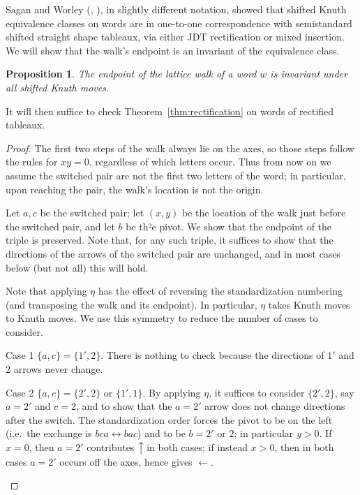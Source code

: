 \documentclass[10pt]{amsart}
\newtheorem{prop}[theorem]{Proposition}
\theoremstyle{definition}
\providecommand{\ie}{i.e.\ }
\newcommand{\west}[1]{\ensuremath{\xleftarrow{\ #1\ }}}
\newcommand{\north}[1]{\ensuremath{\big \uparrow \!\text{\raisebox{.1ex}{\scriptsize $#1$}}}}
\begin{document}
Sagan and Worley (\cite{Sagan}, \cite{Worley}), in slightly different notation, showed that shifted Knuth equivalence classes on words are in one-to-one correspondence with semistandard shifted straight shape tableaux, via either JDT rectification or mixed insertion. We will show that the walk's endpoint is an invariant of the equivalence class.

\begin{prop}\label{prop:walks}
The endpoint of the lattice walk of a word $w$ is invariant under all shifted Knuth moves.
\end{prop}
It will then suffice to check Theorem~\ref{thm:rectification} on words of rectified tableaux. 

\begin{proof}
The first two steps of the walk always lie on the axes, so those steps follow the rules for $xy = 0$, regardless of which letters occur. Thus from now on we assume the switched pair are not the first two letters of the word; in particular, upon reaching the pair, the walk's location is not the origin.

Let $a,c$ be the switched pair; let $(x,y)$ be the location of the walk just before the switched pair, and let $b$ be th²e pivot. We show that the endpoint of the triple is preserved. Note that, for any such triple, it suffices to show that the directions of the arrows of the switched pair are unchanged, and in most cases below (but not all) this will hold.

Note that applying $\eta$ has the effect of reversing the standardization numbering (and transposing the walk and its endpoint). In particular, $\eta$ takes Knuth moves to Knuth moves. We use this symmetry to reduce the number of cases to consider.

\begin{enonce*}[remark]{Case 1} $\{a,c\} = \{1',2\}$. There is nothing to check because the directions of $1'$ and $2$ arrows never change.
\end{enonce*}

\begin{enonce*}[remark]{Case 2} $\{a,c\} = \{2',2\}$ or $\{1',1\}$. By applying $\eta$, it suffices to consider $\{2',2\}$, say $a=2'$ and $c=2$, and to show that the $a=2'$ arrow does not change directions after the switch. The standardization order forces the pivot to be on the left (\ie the exchange is $bca \leftrightarrow bac$) and to be $b = 2'$ or $2$; in particular $y>0$. If $x=0$, then $a=2'$ contributes $\north{}$ in both cases; if instead $x>0$, then in both cases $a=2'$ occurs off the axes, hence gives $\west{}$.
\end{enonce*}


\end{proof}
\end{document}
